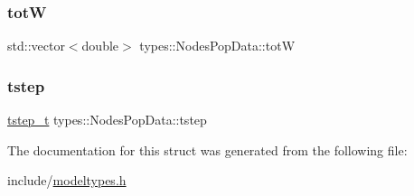 \subsubsection{\texorpdfstring{totW}{totW}}
{\footnotesize\ttfamily std\+::vector$<$double$>$ types\+::\+Nodes\+Pop\+Data\+::totW}

\mbox{\label{structtypes_1_1_nodes_pop_data_ad89a465da8199ed510ce8077813bf79b}} 
\subsubsection{\texorpdfstring{tstep}{tstep}}
{\footnotesize\ttfamily \mbox{\hyperlink{namespacetypes_a9dc53a5ce11a196d82a6983030de8028}{tstep\+\_\+t}} types\+::\+Nodes\+Pop\+Data\+::tstep}



The documentation for this struct was generated from the following file\+:\begin{DoxyCompactItemize}
\item 
include/\mbox{\hyperlink{modeltypes_8h}{modeltypes.\+h}}\end{DoxyCompactItemize}

